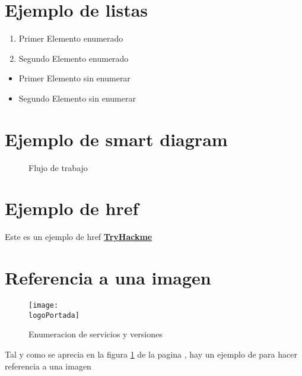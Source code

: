 \documentclass[a4paper]{article} %
\newcommand{\logoPortada}{DIRECCION_ACTUAL/THMlogo.png}
\begin{document}
  \section{Ejemplo de listas} 

  \begin{enumerate}
    \item Primer Elemento enumerado
    \item Segundo Elemento enumerado
  \end{enumerate}


  \begin{itemize}
    \item Primer Elemento sin enumerar
    \item Segundo Elemento sin enumerar
  \end{itemize}


  \section{Ejemplo de smart diagram}


  \begin{figure}[h]
    \begin{center}
      \caption{Flujo de trabajo} 
    \end{center}
  \end{figure}

  \section{Ejemplo de href}

  Este es un ejemplo de href \href{https://tryhackme.com}{\textbf{\color{red}TryHackme}}


  \section{Referencia a una imagen}
 
  \begin{figure}[h]
  \centering
    \texttt{[image: \\logoPortada]}
    \caption{Enumeracion de servicios y versiones}
    \label{fig:servicesResults}

  \end{figure}

  \vspace{0.2cm}

  Tal y como se aprecia en la figura \ref{fig:servicesResults} de la pagina
  \pageref{fig:servicesResults}, hay un ejemplo de para hacer referencia a una
  imagen
 

  \clearpage
\end{document}
